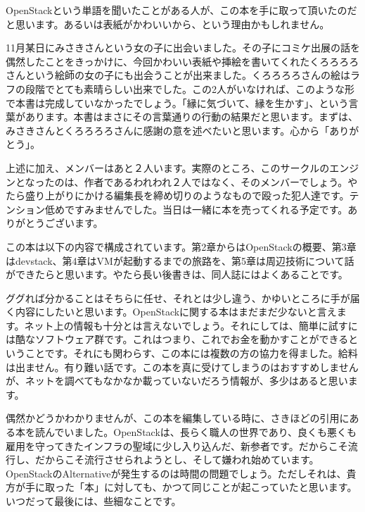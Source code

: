 \documentclass[9pt,b5paper,tombo,openany,dvipdfmx]{jsbook}
\begin{document}
OpenStackという単語を聞いたことがある人が、この本を手に取って頂いたのだと思います。あるいは表紙がかわいいから、という理由かもしれません。

11月某日にみさきさんという女の子に出会いました。その子にコミケ出展の話を偶然したことをきっかけに、今回かわいい表紙や挿絵を書いてくれたくろろろろさんという絵師の女の子にも出会うことが出来ました。くろろろろさんの絵はラフの段階でとても素晴らしい出来でした。この2人がいなければ、このような形で本書は完成していなかったでしょう。「縁に気づいて、縁を生かす」、という言葉があります。本書はまさにその言葉通りの行動の結果だと思います。まずは、みさきさんとくろろろろさんに感謝の意を述べたいと思います。心から「ありがとう」。

上述に加え、メンバーはあと２人います。実際のところ、このサークルのエンジンとなったのは、作者であるわれわれ２人ではなく、そのメンバーでしょう。やたら盛り上がりにかける編集長を締め切りのようなもので殴った犯人達です。テンション低めですみませんでした。当日は一緒に本を売ってくれる予定です。ありがとうございます。

この本は以下の内容で構成されています。第2章からはOpenStackの概要、第3章はdevstack、第4章はVMが起動するまでの旅路を、第5章は周辺技術について話ができたらと思います。やたら長い後書きは、同人誌にはよくあることです。

ググれば分かることはそちらに任せ、それとは少し違う、かゆいところに手が届く内容にしたいと思います。OpenStackに関する本はまだまだ少ないと言えます。ネット上の情報も十分とは言えないでしょう。それにしては、簡単に試すには酷なソフトウェア群です。これはつまり、これでお金を動かすことができるということです。それにも関わらす、この本には複数の方の協力を得ました。給料は出ません。有り難い話です。この本を真に受けてしまうのはおすすめしませんが、ネットを調べてもなかなか載っていないだろう情報が、多少はあると思います。

偶然かどうかわかりませんが、この本を編集している時に、さきほどの引用にある本を読んでいました。OpenStackは、長らく職人の世界であり、良くも悪くも雇用を守ってきたインフラの聖域に少し入り込んだ、新参者です。だからこそ流行し、だからこそ流行させられようとし、そして嫌われ始めています。OpenStackのAlternativeが発生するのは時間の問題でしょう。ただしそれは、貴方が手に取った「本」に対しても、かつて同じことが起こっていたと思います。いつだって最後には、些細なことです。
\end{document}
